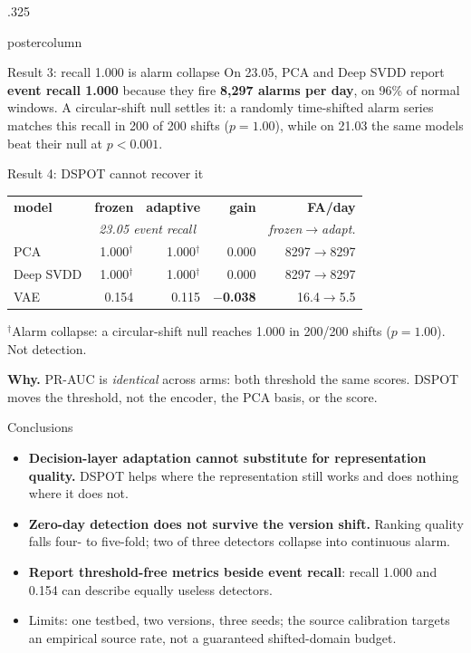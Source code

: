 \documentclass{beamer}
\begin{document}
\begin{frame}
\begin{columns}
\begin{column}{.325\textwidth}
\begin{beamercolorbox}[center]{postercolumn}
\begin{minipage}{.98\textwidth}
{\begin{myblock}{Result 3: recall 1.000 is alarm collapse}
\vspace{0.1cm}
On 23.05, PCA and Deep SVDD report \textbf{event recall 1.000} because they fire
\textbf{8,297 alarms per day}, on 96\% of normal windows. A circular-shift null
settles it: a randomly time-shifted alarm series matches this recall in 200 of 200
shifts ($p=1.00$), while on 21.03 the same models beat their null at $p<0.001$.
\end{myblock}\vfill

\begin{myblock}{Result 4: DSPOT cannot recover it}
\begin{center}
\small
\begin{tabular}{@{}lrrrr@{}}
\toprule
\textbf{model} & \textbf{frozen} & \textbf{adaptive} & \textbf{gain} & \textbf{FA/day} \\
 & \multicolumn{2}{c}{\emph{23.05 event recall}} & & \emph{frozen$\to$adapt.} \\
\midrule
PCA & 1.000$^\dagger$ & 1.000$^\dagger$ & 0.000 & 8297$\to$8297 \\
Deep SVDD & 1.000$^\dagger$ & 1.000$^\dagger$ & 0.000 & 8297$\to$8297 \\
VAE & 0.154 & 0.115 & \textbf{$-$0.038} & 16.4$\to$5.5 \\
\bottomrule
\end{tabular}

\vspace{0.15cm}
{\small $^\dagger$Alarm collapse: a circular-shift null reaches 1.000 in 200/200
shifts ($p=1.00$). Not detection.}
\end{center}

\vspace{0.1cm}
\textbf{Why.} PR-AUC is \emph{identical} across arms: both threshold the same scores.
DSPOT moves the threshold, not the encoder, the PCA basis, or the score.
\end{myblock}\vfill

\begin{myblock}{Conclusions}
\begin{itemize}
  \item \textbf{Decision-layer adaptation cannot substitute for representation
        quality.} DSPOT helps where the representation still works and does nothing
        where it does not.
  \item \textbf{Zero-day detection does not survive the version shift.} Ranking
        quality falls four- to five-fold; two of three detectors collapse into
        continuous alarm.
  \item \textbf{Report threshold-free metrics beside event recall}: recall 1.000 and
        0.154 can describe equally useless detectors.
  \item Limits: one testbed, two versions, three seeds; the source calibration
        targets an empirical source rate, not a guaranteed shifted-domain budget.
\end{itemize}
\end{myblock}\vfill

}
\end{minipage}
\end{beamercolorbox}
\end{column}
\end{columns}
\end{frame}
\end{document}
